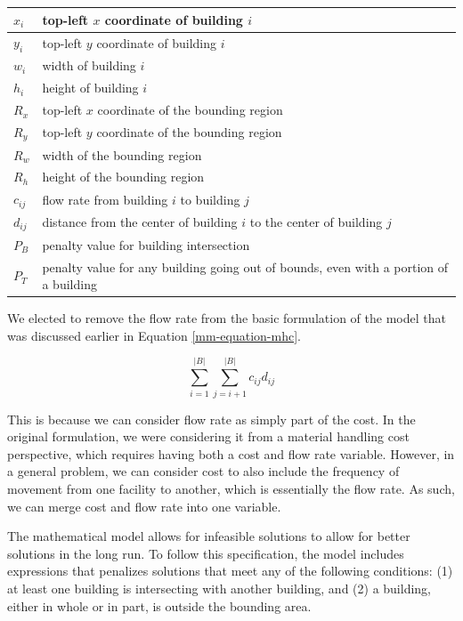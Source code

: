 \begin{table}[h!]
	\centering
	\begin{tabular}{| l | p{10cm} |}
	\hline
	$x_{i}$  & top-left $x$ coordinate of building $i$ \\
	\hline
	$y_{i}$  & top-left $y$ coordinate of building $i$ \\
	\hline
	$w_{i}$  & width of building $i$ \\
	\hline
	$h_{i}$  & height of building $i$ \\
	\hline
	$R_{x}$  & top-left $x$ coordinate of the bounding region \\
	\hline
	$R_{y}$  & top-left $y$ coordinate of the bounding region \\
	\hline
	$R_{w}$  & width of the bounding region \\
	\hline
	$R_{h}$  & height of the bounding region \\
	\hline
	$c_{ij}$ & flow rate from building $i$ to building $j$ \\
	\hline
	$d_{ij}$ & distance from the center of building $i$ to the
	           center of building $j$ \\
	\hline
	$P_{B}$  & penalty value for building intersection \\
	\hline
	$P_{T}$  & penalty value for any building going out of
	           bounds, even with a portion of a building \\
	\hline
	\end{tabular}
\end{table}

We elected to remove the flow rate from the basic formulation of the model that was discussed earlier in Equation \ref{mm-equation-mhc}. 

\begin{equation}\label{mm-equation-mhc}
	\sum_{i=1}^{\left | B \right |}\sum_{j=i + 1}^{\left | B \right |}c_{ij}d_{ij}
\end{equation}

This is because we can consider flow rate as simply part of the cost. In the original formulation, we were considering it from a material handling cost perspective, which requires having both a cost and flow rate variable. However, in a general problem, we can consider cost to also include the frequency of movement from one facility to another, which is essentially the flow rate. As such, we can merge cost and flow rate into one variable.

The mathematical model allows for infeasible solutions to allow for better solutions in the long run. To follow this specification, the model includes expressions that penalizes solutions that meet any of the following conditions: (1) at least one building is intersecting with another building, and (2) a building, either in whole or in part, is outside the bounding area.

